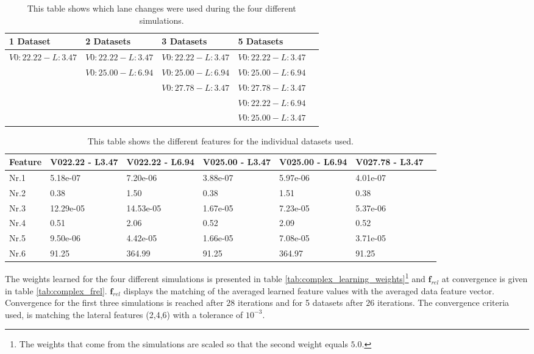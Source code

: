 \begin{table}[h!]
	\centering
	\begin{tabular}{@{}llllr@{}} \toprule
		1 Dataset    & 2 Datasets & 3 Datasets & 5 Datasets\\ \midrule
     $V0:22.22 - L:3.47$  & $V0:22.22 - L:3.47$    & $V0:22.22 - L:3.47$ & $V0:22.22 - L:3.47$		\\
           			 & $V0:25.00 - L:6.94$      & $V0:25.00 - L:6.94$    & $V0:25.00 - L:6.94$  \\
	        		 &        & $V0:27.78 - L:3.47$ & $V0:27.78 - L:3.47$      \\ 
&	&	&$V0:22.22 - L:6.94$	\\
&	&	&$V0:25.00 - L:3.47$	\\\bottomrule
	\end{tabular}
	\caption{This table shows which lane changes were used during the four different simulations.}
	\label{tab:datasets_overview}
\end{table} 


\begin{table}[h!]
	\centering
	\begin{tabular}{@{}llllllr@{}} \toprule
	\textbf{Feature}     & V022.22 - L3.47 & 	V022.22 - L6.94 & V025.00 - L3.47 &	V025.00 - L6.94 & V027.78 - L3.47\\ \midrule
		Nr.1       		  &5.18e-07 &7.20e-06  	& 3.88e-07     & 5.97e-06  & 4.01e-07\\
		Nr.2              & 0.38 &1.50&	     0.38      & 1.51    &       0.38       \\
		Nr.3              & 12.29e-05&14.53e-05	& 1.67e-05 &	7.23e-05 &5.37e-06\\
		Nr.4              & 0.51 &2.06&	         0.52 &          2.09   &   0.52    \\
		Nr.5              & 9.50e-06&4.42e-05   & 1.66e-05      & 7.08e-05  & 3.71e-05       \\
		Nr.6              & 91.25 &	364.99      &	91.25	&364.97       & 91.25       \\ \bottomrule
	\end{tabular}
	\caption{This table shows the different features for the individual datasets used.}
	\label{tab:indi_features}
\end{table} 

The weights learned for the four different simulations is presented in table \ref{tab:complex_learning_weights}\footnote{The weights that come from the simulations are scaled so that the second weight equals $5.0$.} and $\bm{f}_{rel}$ at convergence is given in table \ref{tab:complex_frel}. $\bm{f}_{rel}$ displays the matching of the averaged learned feature values with the averaged data feature vector. Convergence for the first three simulations is reached after $28$ iterations and for 5 datasets after $26$ iterations. The convergence criteria used, is matching the lateral features (2,4,6) with a tolerance of $10^{-3}$.\\

